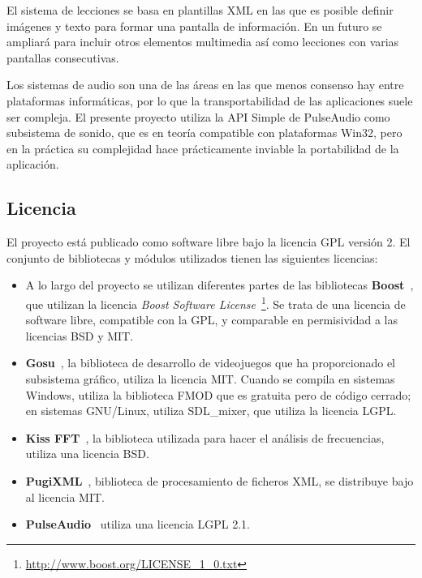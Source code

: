 El sistema de lecciones se basa en plantillas XML en las que es
posible definir imágenes y texto para formar una pantalla
de información. En un futuro se ampliará para incluir otros elementos
multimedia así como lecciones con varias pantallas consecutivas.

Los sistemas de audio son una de las áreas en las que menos consenso hay entre
plataformas informáticas, por lo que la transportabilidad de las aplicaciones
suele ser compleja. El presente proyecto utiliza la API Simple de PulseAudio
como subsistema de sonido, que es en teoría compatible con plataformas Win32,
pero en la práctica su complejidad hace prácticamente inviable la portabilidad
de la aplicación.

\subsection{Licencia}
El proyecto está publicado como software libre bajo la licencia
\ac{GPL} versión 2. El conjunto de bibliotecas y módulos utilizados
tienen las siguientes licencias:
\begin{itemize}

\item A lo largo del proyecto se utilizan diferentes partes de las
  bibliotecas \textbf{Boost}~\cite{boost}, que utilizan la licencia
  \textit{Boost Software License}~\footnote{\url{http://www.boost.org/LICENSE_1_0.txt}}.
  Se trata de una licencia de software libre, compatible con la GPL, y
  comparable en permisividad a las licencias BSD y MIT.

\item \textbf{Gosu}~\cite{gosu}, la biblioteca de desarrollo de
  videojuegos que ha proporcionado el subsistema gráfico, utiliza la
  licencia \ac{MIT}. Cuando se compila en sistemas Windows, utiliza la
  biblioteca FMOD que es gratuita pero de código cerrado; en sistemas
  GNU/Linux, utiliza SDL\_mixer, que utiliza la licencia \ac{LGPL}.

\item \textbf{Kiss FFT}~\cite{kissfft}, la biblioteca utilizada para
  hacer el análisis de frecuencias, utiliza una licencia \ac{BSD}.

\item \textbf{PugiXML}~\cite{pugixml}, biblioteca de procesamiento de
  ficheros XML, se distribuye bajo al licencia MIT.

\item \textbf{PulseAudio}~\cite{pulseaudio} utiliza una licencia LGPL 2.1.
\end{itemize}

